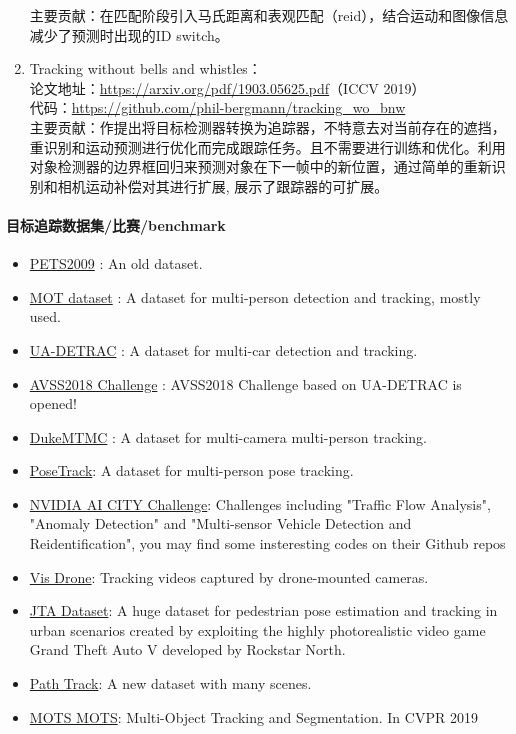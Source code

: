 \documentclass[lang=cn,11pt,a4paper]{eleganttemplate}
\begin{document}
\begin{enumerate}
    主要贡献：在匹配阶段引入马氏距离和表观匹配（reid），结合运动和图像信息减少了预测时出现的ID switch。
    \item Tracking without bells and whistles：\\ 
    论文地址：\href{https://arxiv.org/pdf/1903.05625.pdf}{https://arxiv.org/pdf/1903.05625.pdf}（ICCV 2019） \\
    代码：\href{https://github.com/phil-bergmann/tracking_wo_bnw}{https://github.com/phil-bergmann/tracking\_wo\_bnw}  \\
    主要贡献：作提出将目标检测器转换为追踪器，不特意去对当前存在的遮挡，重识别和运动预测进行优化而完成跟踪任务。且不需要进行训练和优化。利用对象检测器的边界框回归来预测对象在下一帧中的新位置，通过简单的重新识别和相机运动补偿对其进行扩展, 展示了跟踪器的可扩展。
\end{enumerate}

\paragraph{目标追踪数据集/比赛/benchmark} 
\begin{itemize}
\item \href{http://www.cvg.reading.ac.uk/PETS2009/a.html}{PETS2009} : An old dataset.
\item \href{https://motchallenge.net/}{MOT dataset} : A dataset for multi-person detection and tracking, mostly used.
\item \href{http://detrac-db.rit.albany.edu/}{UA-DETRAC} : A dataset for multi-car detection and tracking. 
\item \href{https://iwt4s2018.wordpress.com/challenge/}{AVSS2018 Challenge} : AVSS2018 Challenge based on UA-DETRAC is opened!
\item \href{http://vision.cs.duke.edu/DukeMTMC/}{DukeMTMC} : A dataset for multi-camera multi-person tracking. 
\item \href{https://posetrack.net/}{PoseTrack}: A dataset for multi-person pose tracking. 
\item \href{https://www.aicitychallenge.org/}{NVIDIA AI CITY Challenge}: Challenges including "Traffic Flow Analysis", "Anomaly Detection" and "Multi-sensor Vehicle Detection and Reidentification", you may find some insteresting codes on their Github repos
\item \href{http://www.aiskyeye.com/views/index}{Vis Drone}: Tracking videos captured by drone-mounted cameras.
\item \href{http://imagelab.ing.unimore.it/imagelab/page.asp?IdPage=25}{JTA Dataset}: A huge dataset for pedestrian pose estimation and tracking in urban scenarios created by exploiting the highly photorealistic video game Grand Theft Auto V developed by Rockstar North.
\item \href{http://people.ee.ethz.ch/~daid/pathtrack/}{Path Track}: A new dataset with many scenes.
\item \href{https://www.vision.rwth-aachen.de/page/mots}{MOTS MOTS}: Multi-Object Tracking and Segmentation. In CVPR 2019
\end{itemize}
\end{document}
